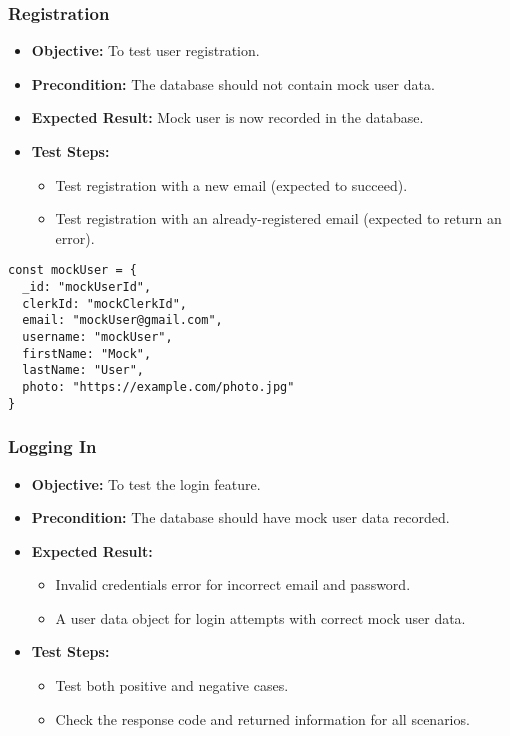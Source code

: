 \vspace{1cm}

\subsubsection{Registration}
\begin{itemize}
    \item \textbf{Objective:} To test user registration.
    \item \textbf{Precondition:} The database should not contain mock user data.
    \item \textbf{Expected Result:} Mock user is now recorded in the database.
    \item \textbf{Test Steps:}
    \begin{itemize}
        \item Test registration with a new email (expected to succeed).
        \item Test registration with an already-registered email (expected to return an error).
    \end{itemize}
\end{itemize}

\begin{lstlisting}[style=typescript, caption={Mock Test Data - User}]
const mockUser = {
  _id: "mockUserId",
  clerkId: "mockClerkId",
  email: "mockUser@gmail.com",
  username: "mockUser",
  firstName: "Mock",
  lastName: "User",
  photo: "https://example.com/photo.jpg"
}
\end{lstlisting}  

\subsubsection{Logging In}
\begin{itemize}
    \item \textbf{Objective:} To test the login feature.
    \item \textbf{Precondition:} The database should have mock user data recorded.
    \item \textbf{Expected Result:} 
    \begin{itemize}
        \item Invalid credentials error for incorrect email and password.
        \item A user data object for login attempts with correct mock user data.
    \end{itemize}
    \item \textbf{Test Steps:}
    \begin{itemize}
        \item Test both positive and negative cases.
        \item Check the response code and returned information for all scenarios.
    \end{itemize}
\end{itemize}

